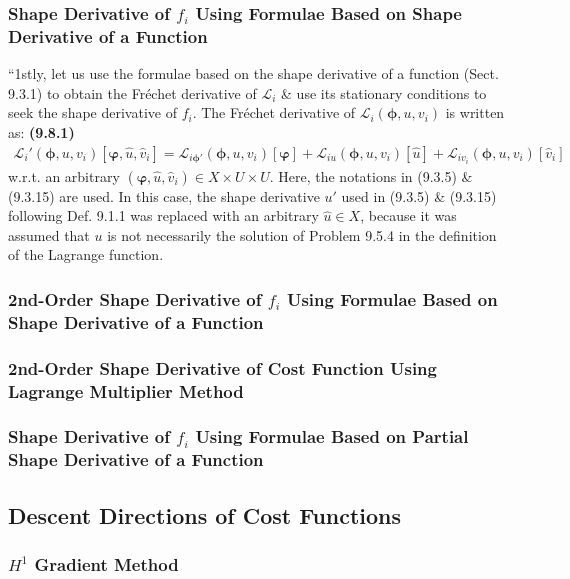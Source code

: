 \documentclass[oneside]{book}
\numberwithin{equation}{section}
\begin{document}
\subsubsection{Shape Derivative of $f_i$ Using Formulae Based on Shape Derivative of a Function}
``1stly, let us use the formulae based on the shape derivative of a function (Sect. 9.3.1) to obtain the Fr\'echet derivative of $\mathcal{L}_i$ \& use its stationary conditions to seek the shape derivative of $f_i$. The Fr\'echet derivative of $\mathcal{L}_i(\boldsymbol{\phi},u,v_i)$ is written as: \textbf{(9.8.1)}
\begin{align*}
	\mathcal{L}_i'(\boldsymbol{\phi},u,v_i)[\boldsymbol{\varphi},\hat{u},\hat{v}_i] = \mathcal{L}_{i\boldsymbol{\phi}'}(\boldsymbol{\phi},u,v_i)[\boldsymbol{\varphi}] + \mathcal{L}_{iu}(\boldsymbol{\phi},u,v_i)[\hat{u}] + \mathcal{L}_{iv_i}(\boldsymbol{\phi},u,v_i)[\hat{v}_i]
\end{align*}
w.r.t. an arbitrary $(\boldsymbol{\varphi},\hat{u},\hat{v}_i)\in X\times U\times U$. Here, the notations in (9.3.5) \& (9.3.15) are used. In this case, the shape derivative $u'$ used in (9.3.5) \& (9.3.15) following Def. 9.1.1 was replaced with an arbitrary $\hat{u}\in X$, because it was assumed that $u$ is not necessarily the solution of Problem 9.5.4 in the definition of the Lagrange function.

\subsubsection{2nd-Order Shape Derivative of $f_i$ Using Formulae Based on Shape Derivative of a Function}

\subsubsection{2nd-Order Shape Derivative of Cost Function Using Lagrange Multiplier Method}

\subsubsection{Shape Derivative of $f_i$ Using Formulae Based on Partial Shape Derivative of a Function}

\subsection{Descent Directions of Cost Functions}

\subsubsection{$H^1$ Gradient Method}
\end{document}
